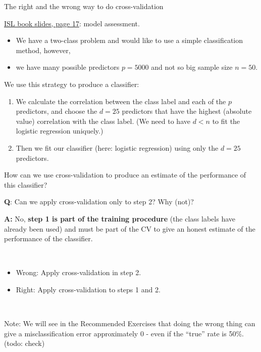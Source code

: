 \documentclass[10pt,ignorenonframetext,]{beamer}
\providecommand{\tightlist}{%
  \setlength{\itemsep}{0pt}\setlength{\parskip}{0pt}}
\begin{document}
\begin{frame}

\begin{block}{The right and the wrong way to do cross-validation}

\href{https://lagunita.stanford.edu/c4x/HumanitiesScience/StatLearning/asset/cv_boot.pdf}{ISL
book slides, page 17}: model assessment.

\begin{itemize}
\tightlist
\item
  We have a two-class problem and would like to use a simple
  classification method, however,
\item
  we have many possible predictors \(p=5000\) and not so big sample size
  \(n=50\).
\end{itemize}

We use this strategy to produce a classifier:

\begin{enumerate}
\def\labelenumi{\arabic{enumi}.}
\tightlist
\item
  We calculate the correlation between the class label and each of the
  \(p\) predictors, and choose the \(d=25\) predictors that have the
  highest (absolute value) correlation with the class label. (We need to
  have \(d<n\) to fit the logistic regression uniquely.)
\item
  Then we fit our classifier (here: logistic regression) using only the
  \(d=25\) predictors.
\end{enumerate}

How can we use cross-validation to produce an estimate of the
performance of this classifier?

\end{block}

\end{frame}

\begin{frame}

\textbf{Q}: Can we apply cross-validation only to step 2? Why (not)?

\textbf{A:} No, \textbf{step 1 is part of the training procedure} (the
class labels have already been used) and must be part of the CV to give
an honest estimate of the performance of the classifier.

\(~\)

\begin{itemize}
\tightlist
\item
  Wrong: Apply cross-validation in step 2.
\item
  Right: Apply cross-validation to steps 1 and 2.
\end{itemize}

\(~\)

Note: We will see in the Recommended Exercises that doing the wrong
thing can give a misclassification error approximately 0 - even if the
``true'' rate is 50\%. (todo: check)

\end{frame}
\end{document}
